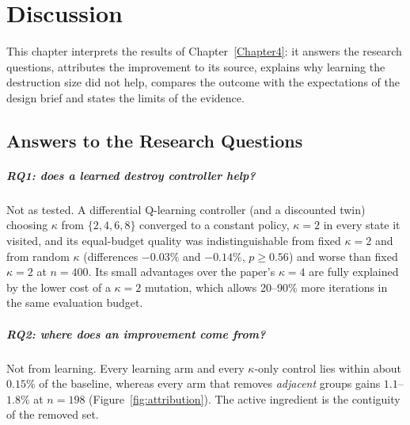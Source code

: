 
\chapter{Discussion} %

\label{Chapter5} %


This chapter interprets the results of Chapter~\ref{Chapter4}: it answers the research questions, attributes the improvement to its source, explains why learning the destruction size did not help, compares the outcome with the expectations of the design brief and states the limits of the evidence.


\section{Answers to the Research Questions}

\paragraph{RQ1: does a learned destroy controller help?} Not as tested. A differential Q-learning controller (and a discounted twin) choosing $\kappa$ from $\{2,4,6,8\}$ converged to a constant policy, $\kappa=2$ in every state it visited, and its equal-budget quality was indistinguishable from fixed $\kappa=2$ and from random $\kappa$ (differences $-0.03\%$ and $-0.14\%$, $p\ge0.56$) and worse than fixed $\kappa=2$ at $n=400$. Its small advantages over the paper's $\kappa=4$ are fully explained by the lower cost of a $\kappa=2$ mutation, which allows 20--90\% more iterations in the same evaluation budget.

\paragraph{RQ2: where does an improvement come from?} Not from learning. Every learning arm and every $\kappa$-only control lies within about $0.15\%$ of the baseline, whereas every arm that removes \emph{adjacent} groups gains $1.1$--$1.8\%$ at $n=198$ (Figure~\ref{fig:attribution}). The active ingredient is the contiguity of the removed set.

